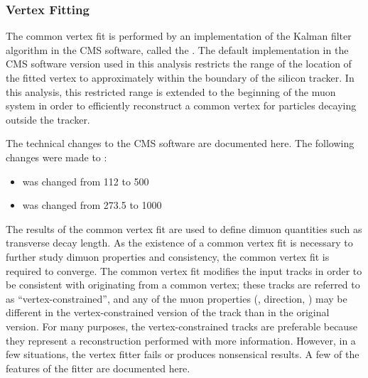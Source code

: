 \subsubsection{Vertex Fitting}
\label{sec:dd:VertexFitting}
The common vertex fit is performed by an implementation of the Kalman filter algorithm in the CMS software, called the  \cite{Fruhwirth:1987fm,Speer:927395}.
The default implementation in the CMS software version used in this analysis restricts the range of the location of the fitted vertex to approximately within the boundary of the silicon tracker.
In this analysis, this restricted range is extended to the beginning of the muon system in order to efficiently reconstruct a common vertex for particles decaying outside the tracker.

The technical changes to the CMS software are documented here.
The following changes were made to :
\begin{itemize}
  \item {} was changed from 112 to 500
  \item {} was changed from 273.5 to 1000
\end{itemize}

The results of the common vertex fit are used to define dimuon quantities such as transverse decay length.
As the existence of a common vertex fit is necessary to further study dimuon properties and consistency, the common vertex fit is required to converge.
The common vertex fit modifies the input tracks in order to be consistent with originating from a common vertex; these tracks are referred to as ``vertex-constrained'', and any of the muon properties (\pT, direction, \etc) may be different in the vertex-constrained version of the track than in the original version.
For many purposes, the vertex-constrained tracks are preferable because they represent a reconstruction performed with more information.
However, in a few situations, the vertex fitter fails or produces nonsensical results.
A few of the features of the fitter are documented here.

